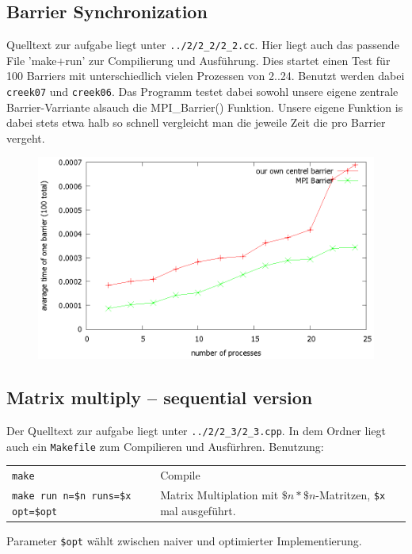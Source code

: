 \documentclass[a4paper,11pt]{scrartcl}
\begin{document}
\subsection{Barrier Synchronization}
Quelltext zur aufgabe liegt unter \verb+../2/2_2/2_2.cc+. Hier liegt auch das passende File 'make+run' zur Compilierung und Ausführung. Dies startet einen Test für 100 Barriers mit unterschiedlich vielen Prozessen von 2..24. Benutzt werden dabei \verb+creek07+ und \verb+creek06+. Das Programm testet dabei sowohl unsere eigene zentrale Barrier-Varriante alsauch die MPI\_Barrier() Funktion. Unsere eigene Funktion is dabei stets etwa halb so schnell vergleicht man die jeweile Zeit die pro Barrier vergeht.

\begin{figure}[!ht]
\includegraphics[width=\linewidth,
keepaspectratio]{./2_2/bild.eps}
\centering
\end{figure}

\subsection{Matrix multiply – sequential version}

Der Quelltext zur aufgabe liegt unter \verb+../2/2_3/2_3.cpp+. In dem Ordner liegt auch ein \verb+Makefile+ zum Compilieren und Ausfürhren. Benutzung: 

\begin{table}[!ht]
    \begin{tabular}{ll}
    \verb+make+& Compile \\ 
    \verb+make run n=$n runs=$x opt=$opt+ & Matrix Multiplation mit $\$n*\$n$-Matritzen, \verb+$x+ mal ausgeführt. \\
    \end{tabular}
\end{table}
Parameter \verb+$opt+ wählt zwischen naiver und optimierter Implementierung.\\
\end{document}
